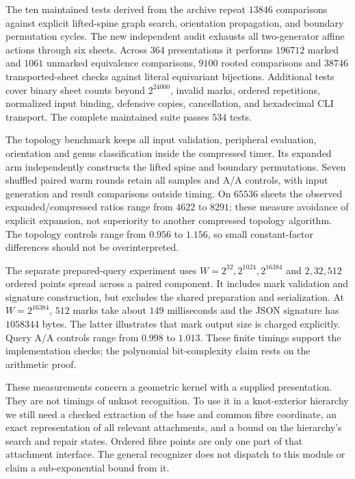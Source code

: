 The ten maintained tests derived from the archive repeat $13846$ comparisons
against explicit lifted-spine graph search, orientation propagation, and
boundary permutation cycles.  The new independent audit exhausts all
two-generator affine actions through six sheets.  Across $364$ presentations
it performs $196712$ marked and $1061$ unmarked equivalence comparisons,
$9100$ rooted comparisons and $38746$ transported-sheet checks against
literal equivariant bijections.  Additional tests cover binary sheet counts
beyond $2^{24000}$, invalid marks, ordered repetitions, normalized input
binding, defensive copies, cancellation, and hexadecimal CLI transport.
The complete maintained suite passes $534$ tests.



The topology benchmark keeps all input validation, peripheral evaluation,
orientation and genus classification inside the compressed timer.  Its expanded
arm independently constructs the lifted spine and boundary permutations.
Seven shuffled paired warm rounds retain all samples and A/A controls, with
input generation and result comparisons outside timing.  On $65536$ sheets
the observed expanded/compressed ratios range from $4622$ to $8291$; these
measure avoidance of explicit expansion, not superiority to another compressed
topology algorithm.  The topology controls range from $0.956$ to $1.156$,
so small constant-factor differences should not be overinterpreted.

The separate prepared-query experiment uses $W=2^{32},2^{1024},2^{16384}$
and $2,32,512$ ordered points spread across a paired component.  It includes
mark validation and signature construction, but excludes the shared preparation
and serialization.  At $W=2^{16384}$, $512$ marks take about $149$ milliseconds
and the JSON signature has $1058344$ bytes.  The latter illustrates that
mark output size is charged explicitly.  Query A/A controls range from
$0.998$ to $1.013$.  These finite timings support the implementation checks;
the polynomial bit-complexity claim rests on the arithmetic proof.

These measurements concern a geometric kernel with a supplied presentation.
They are not timings of unknot recognition.  To use it in a knot-exterior
hierarchy we still need a checked extraction of the base and common fibre
coordinate, an exact representation of all relevant attachments, and a
bound on the hierarchy's search and repair states.  Ordered fibre points
are only one part of that attachment interface.  The general recognizer
does not dispatch to this module or claim a sub-exponential bound from it.
